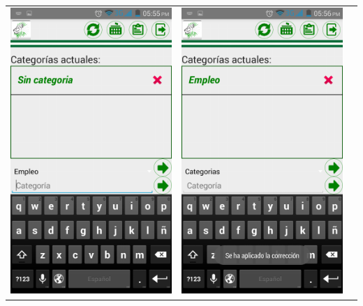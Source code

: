 \begin{tabular}{p{7cm}p{8mm}p{7cm}}
\\
\includegraphics[width=6.5cm]{./android/imagenes/cat3.png}

&

\includegraphics[width=6.5cm]{./android/imagenes/cat4.png}

\\

\end{tabular}

